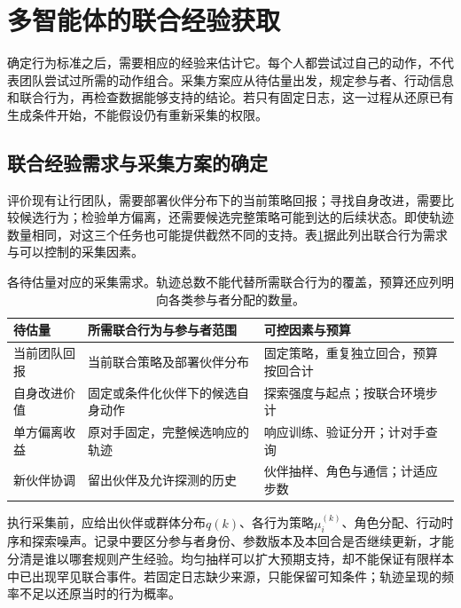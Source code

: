 \section{多智能体的联合经验获取}
\label{sec:rl-multi-agent-data}

确定行为标准之后，需要相应的经验来估计它。每个人都尝试过自己的动作，不代表团队尝试过所需的动作组合。采集方案应从待估量出发，规定参与者、行动信息和联合行为，再检查数据能够支持的结论。若只有固定日志，这一过程从还原已有生成条件开始，不能假设仍有重新采集的权限。

\subsection{联合经验需求与采集方案的确定}
\label{sec:rl-multi-agent-collection-plan}

评价现有让行团队，需要部署伙伴分布下的当前策略回报；寻找自身改进，需要比较候选行为；检验单方偏离，还需要候选完整策略可能到达的后续状态。即使轨迹数量相同，对这三个任务也可能提供截然不同的支持。表\ref{tab:rl-multi-agent-data-needs}据此列出联合行为需求与可以控制的采集因素。

\begin{table}[htbp]
 \centering
 \begin{tabularx}{\linewidth}{@{}l >{\raggedright\arraybackslash}X >{\raggedright\arraybackslash}X@{}}
 \toprule
 待估量 & 所需联合行为与参与者范围 & 可控因素与预算\\
 \midrule
 当前团队回报 & 当前联合策略及部署伙伴分布 & 固定策略，重复独立回合，预算按回合计\\
 自身改进价值 & 固定或条件化伙伴下的候选自身动作 & 探索强度与起点；按联合环境步计\\
 单方偏离收益 & 原对手固定，完整候选响应的轨迹 & 响应训练、验证分开；计对手查询\\
 新伙伴协调 & 留出伙伴及允许探测的历史 & 伙伴抽样、角色与通信；计适应步数\\
 \bottomrule
 \end{tabularx}
 \caption{各待估量对应的采集需求。轨迹总数不能代替所需联合行为的覆盖，预算还应列明向各类参与者分配的数量。}
 \label{tab:rl-multi-agent-data-needs}
\end{table}

执行采集前，应给出伙伴或群体分布$q(k)$、各行为策略$\mu_i^{(k)}$、角色分配、行动时序和探索噪声。记录中要区分参与者身份、参数版本及本回合是否继续更新，才能分清是谁以哪套规则产生经验。均匀抽样可以扩大预期支持，却不能保证有限样本中已出现罕见联合事件。若固定日志缺少来源，只能保留可知条件；轨迹呈现的频率不足以还原当时的行为概率。

